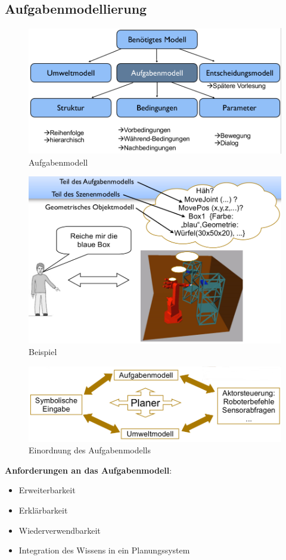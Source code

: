 \subsection{Aufgabenmodellierung}
\begin{figure}[h!]\centering 
\includegraphics[width=0.6\linewidth]{figures/ch02_aufgabenmodell.png}
\caption{Aufgabenmodell}
\label{fig:ch02_am}
\end{figure}
\begin{figure}[ht]\centering 
\includegraphics[width=0.6\linewidth]{figures/ch02_beispiel.png}
\caption{Beispiel}
\label{fig:ch02_bsp}
\end{figure}
\begin{figure}[h!]\centering 
\includegraphics[width=0.6\linewidth]{figures/ch02_planer.png}
\caption{Einordnung des Aufgabenmodells}
\label{fig:ch02_ord}
\end{figure}
\textbf{Anforderungen an das Aufgabenmodell}:
\begin{itemize}
\item Erweiterbarkeit
\item Erklärbarkeit
\item Wiederverwendbarkeit
\item Integration des Wissens in ein Planungssystem
\end{itemize}
\newpage
